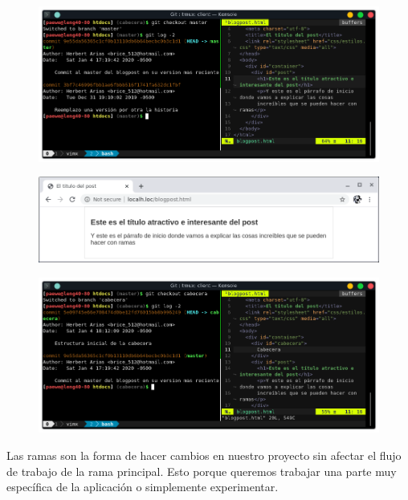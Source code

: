 \documentclass{article}
\begin{document}
\newpage

\begin{figure}[h!]
  \centering
  \includegraphics[scale=0.75]{./Pictures/143_checkout_master_log.png}
\end{figure}

\begin{figure}[h!]
  \centering
  \includegraphics[scale=0.75]{./Pictures/144_master_web.png}
\end{figure}

\begin{figure}[h!]
  \centering
  \includegraphics[scale=0.75]{./Pictures/145_checkout_cabecera.png}
\end{figure}


Las ramas son la forma de hacer cambios en nuestro proyecto sin afectar el
flujo de trabajo de la rama principal. Esto porque queremos trabajar una parte
muy específica de la aplicación o simplemente experimentar.

\newpage
\end{document}
